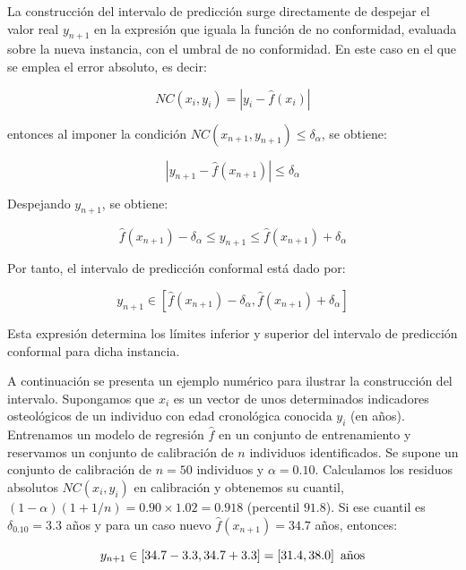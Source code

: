 La construcción del intervalo de predicción surge directamente de despejar el valor real $y_{n+1}$ en la expresión que iguala la función de no conformidad, evaluada sobre la nueva instancia, con el umbral de no conformidad. En este caso en el que se emplea el error absoluto, es decir:

$$
NC(x_i, y_i) = | y_i - \hat{f}(x_i) |
$$

entonces al imponer la condición $NC(x_{n+1}, y_{n+1}) \le \delta_\alpha$, se obtiene: 

$$
|y_{n+1}-\hat{f}(x_{n+1})| \le \delta_\alpha
$$

Despejando $y_{n+1}$, se obtiene:

$$
\hat{f}(x_{n+1}) - \delta_\alpha \le y_{n+1} \le \hat{f}(x_{n+1}) + \delta_\alpha 
$$

Por tanto, el intervalo de predicción conformal está dado por:

$$
y_{n+1} \in \left[ \hat{f}(x_{n+1})-\delta_\alpha , \hat{f}(x_{n+1})+\delta_\alpha  \right] 
$$

Esta expresión determina los límites inferior y superior del intervalo de predicción conformal para dicha
instancia.


A continuación se presenta un ejemplo numérico para ilustrar la construcción del intervalo. Supongamos que $x_i$ es un vector de unos determinados indicadores osteológicos de un individuo con edad cronológica conocida $y_i$ (en años). Entrenamos un modelo de regresión $\hat{f}$ en un conjunto de entrenamiento y reservamos un conjunto de calibración de $n$ individuos identificados.
Se supone un conjunto de calibración de $n=50$ individuos y $\alpha=0.10$. Calculamos los residuos absolutos $NC(x_i,y_i)$ en calibración y obtenemos su cuantil, $(1-\alpha)(1+1/n)=0.90\times1.02=0.918$ (percentil $91.8$). Si ese cuantil es $\delta_{0.10}=3.3$ años y para un caso nuevo $\hat{f}(x_{n+1})=34.7$ años, entonces:

$$
y_{n+1} \in \left[ 34.7 - 3.3 , 34.7 + 3.3  \right] = \left[ 31.4 , 38.0 \right] \textnormal{ años}
$$

